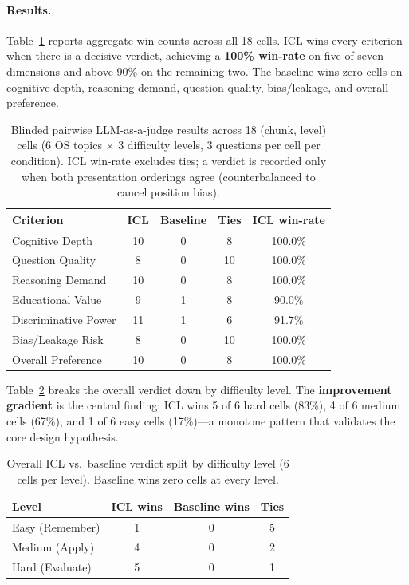 \documentclass[12pt,a4paper]{report}
\begin{document}
\paragraph{Results.}
Table~\ref{tab:judge} reports aggregate win counts across all 18 cells.
ICL wins every criterion when there is a decisive verdict, achieving a
\textbf{100\% win-rate} on five of seven dimensions and above 90\% on the
remaining two. The baseline wins zero cells on cognitive depth, reasoning demand,
question quality, bias/leakage, and overall preference.

\begin{table}[ht]
\centering
\caption{Blinded pairwise LLM-as-a-judge results across 18 (chunk, level) cells
(6 OS topics $\times$ 3 difficulty levels, 3 questions per cell per condition).
ICL win-rate excludes ties; a verdict is recorded only when both presentation
orderings agree (counterbalanced to cancel position bias).}
\label{tab:judge}
\begin{tabular}{lcccc}
\toprule
\textbf{Criterion} & \textbf{ICL} & \textbf{Baseline} & \textbf{Ties} & \textbf{ICL win-rate} \\
\midrule
Cognitive Depth      & 10 & 0 &  8 & 100.0\% \\
Question Quality     &  8 & 0 & 10 & 100.0\% \\
Reasoning Demand     & 10 & 0 &  8 & 100.0\% \\
Educational Value    &  9 & 1 &  8 &  90.0\% \\
Discriminative Power & 11 & 1 &  6 &  91.7\% \\
Bias/Leakage Risk    &  8 & 0 & 10 & 100.0\% \\
Overall Preference   & 10 & 0 &  8 & 100.0\% \\
\bottomrule
\end{tabular}
\end{table}

Table~\ref{tab:judge_by_level} breaks the overall verdict down by difficulty
level. The \textbf{improvement gradient} is the central finding: ICL wins
5 of 6 hard cells (83\%), 4 of 6 medium cells (67\%), and 1 of 6 easy cells
(17\%)---a monotone pattern that validates the core design hypothesis.

\begin{table}[ht]
\centering
\caption{Overall ICL vs.\ baseline verdict split by difficulty level (6 cells
per level). Baseline wins zero cells at every level.}
\label{tab:judge_by_level}
\begin{tabular}{lccc}
\toprule
\textbf{Level} & \textbf{ICL wins} & \textbf{Baseline wins} & \textbf{Ties} \\
\midrule
Easy   (Remember) & 1 & 0 & 5 \\
Medium (Apply)    & 4 & 0 & 2 \\
Hard   (Evaluate) & 5 & 0 & 1 \\
\bottomrule
\end{tabular}
\end{table}
\end{document}
